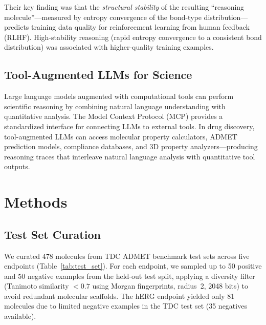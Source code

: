 \documentclass[11pt]{article}
\begin{document}
Their key finding was that the \emph{structural stability} of the resulting ``reasoning molecule''---measured by entropy convergence of the bond-type distribution---predicts training data quality for reinforcement learning from human feedback (RLHF). High-stability reasoning (rapid entropy convergence to a consistent bond distribution) was associated with higher-quality training examples.

\subsection{Tool-Augmented LLMs for Science}

Large language models augmented with computational tools \citep{schick2023toolformer, ramos2024review} can perform scientific reasoning by combining natural language understanding with quantitative analysis. The Model Context Protocol (MCP) \citep{anthropic2025mcp} provides a standardized interface for connecting LLMs to external tools. In drug discovery, tool-augmented LLMs can access molecular property calculators, ADMET prediction models, compliance databases, and 3D property analyzers---producing reasoning traces that interleave natural language analysis with quantitative tool outputs.

\section{Methods}
\label{sec:methods}

\subsection{Test Set Curation}
\label{sec:test_set}

We curated 478 molecules from TDC ADMET benchmark test sets \citep{huang2021therapeutics} across five endpoints (Table~\ref{tab:test_set}). For each endpoint, we sampled up to 50 positive and 50 negative examples from the held-out test split, applying a diversity filter (Tanimoto similarity $< 0.7$ using Morgan fingerprints, radius~2, 2048 bits) to avoid redundant molecular scaffolds. The hERG endpoint yielded only 81 molecules due to limited negative examples in the TDC test set (35 negatives available).
\end{document}

